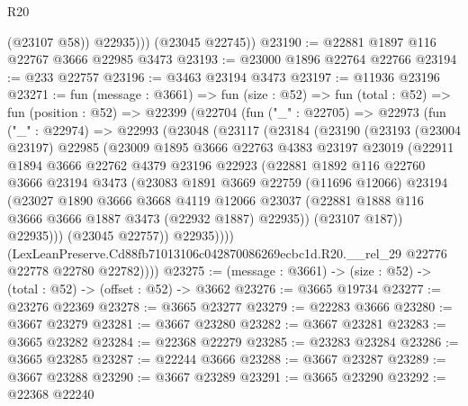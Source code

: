 \begin{lexlean}{R20}
\begin{coremodule}
              (@23107 @58))
            @22935)))
      (@23045 @22745))
@23190 := @22881 @1897 @116 @22767 @3666 @22985 @3473
@23193 := @23000 @1896 @22764 @22766
@23194 := @233 @22757
@23196 := @3463 @23194 @3473
@23197 := @11936 @23196
@23271 := fun (message : @3661) =>
  fun (size : @52) =>
  fun (total : @52) =>
  fun (position : @52) =>
  @22399
    (@22704
      (fun ("_" : @22705) =>
      @22973
        (fun ("_" : @22974) =>
        @22993
          (@23048
            (@23117
              (@23184
                (@23190
                  (@23193
                    (@23004 @23197)
                    @22985
                    (@23009
                      @1895
                      @3666
                      @22763
                      @4383
                      @23197
                      @23019
                      (@22911
                        @1894
                        @3666
                        @22762
                        @4379
                        @23196
                        @22923
                        (@22881
                          @1892
                          @116
                          @22760
                          @3666
                          @23194
                          @3473
                          (@23083
                            @1891
                            @3669
                            @22759
                            (@11696 @12066)
                            @23194
                            (@23027
                              @1890
                              @3666
                              @3668
                              @4119
                              @12066
                              @23037
                              (@22881 @1888 @116 @3666 @3666 @1887 @3473 (@22932 @1887) @22935))
                            (@23107 @187))
                          @22935)))
                    (@23045 @22757))
                  @22935))))
          (LexLeanPreserve.Cd88fb71013106c042870086269ecbc1d.R20.__rel_29
            @22776
            @22778
            @22780
            @22782))))
@23275 := (message : @3661) -> (size : @52) -> (total : @52) -> (offset : @52) -> @3662
@23276 := @3665 @19734
@23277 := @23276 @22369
@23278 := @3665 @23277
@23279 := @22283 @3666
@23280 := @3667 @23279
@23281 := @3667 @23280
@23282 := @3667 @23281
@23283 := @3665 @23282
@23284 := @22368 @22279
@23285 := @23283 @23284
@23286 := @3665 @23285
@23287 := @22244 @3666
@23288 := @3667 @23287
@23289 := @3667 @23288
@23290 := @3667 @23289
@23291 := @3665 @23290
@23292 := @22368 @22240

\end{coremodule}
\end{lexlean}

